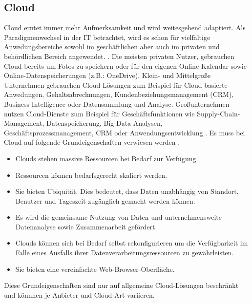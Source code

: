 \documentclass[12pt,bibtotoc]{article}
\begin{document}
		\subsection{Cloud}
		Cloud erntet immer mehr Aufmerksamkeit und wird weitesgehend adaptiert. Als Paradigmenwechsel in der IT betrachtet, wird es schon für vielfältige Anwedungsbereiche sowohl im geschäftlichen aber auch im privaten und behördlichen Bereich angewendet. \cite{Murugesan.2016}.
		\newline
		Die meisten privaten Nutzer, gebrauchen Cloud bereits um Fotos zu speichern oder für den eigenen Online-Kalendar sowie Online-Datenspeicherungen (z.B.: OneDrive). \newline 
		Klein- und Mittelgroße Unternehmen gebrauchen Cloud-Lösungen zum Beispiel für Cloud-basierte Anwedungen, Gehaltsabrechnungen, Kundenbeziehungsmanagement (CRM), Business Intelligence oder Datensammlung und Analyse. \newline
		Großunternehmen nutzen Cloud-Dienste zum Beispiel für Geschäftsfunktionen wie Supply-Chain-Management, Datenspeicherung, Big-Data-Analysen, Geschäftsprozessmanagement, CRM oder Anwendungsentwicklung \cite{Murugesan.2016}.
		\newline
			Es muss bei Cloud auf folgende Grundeigenschaften verwiesen werden \cite{Murugesan.2016}.
			\begin{itemize}
				\item Clouds stehen massive Ressourcen bei Bedarf zur Verfügung.
				\item Ressourcen können bedarfsgerecht skaliert werden.
				\item Sie bieten Ubiquität. Dies bedeutet, dass Daten unabhängig von Standort, Benutzer und Tageszeit zugänglich gemacht werden können.
				\item Es wird die gemeinsame Nutzung von Daten und unternehmensweite Datenanalyse sowie Zusammenarbeit gefördert.
				\item Clouds können sich bei Bedarf selbst rekonfigurieren um die Verfügbarkeit im Falle eines Ausfalls ihrer Datenverarbeitungsressourcen zu gewährleisten.
				\item Sie bieten eine vereinfachte Web-Browser-Oberfläche.
			\end{itemize}
		Diese Grundeigenschaften sind nur auf allgemeine Cloud-Lösungen beschränkt und könnnen je Anbieter und Cloud-Art variieren.
		\newpage
\end{document}
